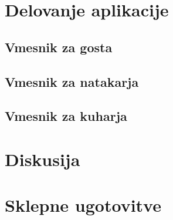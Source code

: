 \documentclass[a4paper, 12pt]{book}
\begin{document}
\chapter {Delovanje aplikacije}
\section{Vmesnik za gosta}
\section{Vmesnik za natakarja}
\section{Vmesnik za kuharja}

\chapter {Diskusija}

\chapter {Sklepne ugotovitve}
\newpage %
\ \\
\clearpage
{}


\end{document}
